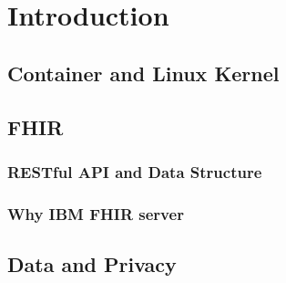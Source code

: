 \chapter{Introduction}

\section{Container and Linux Kernel}

\section{FHIR}
\subsection{RESTful API and Data Structure}
\subsection{Why IBM FHIR server}

\section{Data and Privacy}
